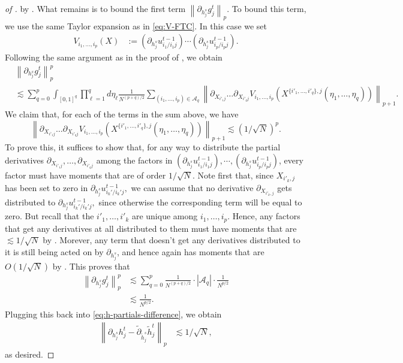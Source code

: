 \documentclass[10pt,a4paper]{amsart}
\newcommand{\calA}{\mathcal{A}}
\newcommand{\norm}[1]{\left\lVert#1\right\rVert}
\begin{document}
\begin{proof}[of ]
    by . What remains is to bound the first term $ \norm{\partial_{ h_j^s} g_j^t}_p.$ To bound this term, we use the same Taylor expansion as in \eqref{eq:V-FTC}. In this case we set 
    \begin{align}\label{eq:V-expansion-new}
    V_{i_1,\dots,i_p}(X) &:= (\partial_{ h_j^s} u_{i_1/i_1j}^{t-1}) \cdots (\partial_{ h_j^s} u_{i_p/i_pj}^{t-1}).
\end{align}
Following the same argument as in the proof of , we obtain 
\begin{align}
    &\norm{\partial_{h_j^s} g_j^t}_p^p \nonumber\\
    &\lesssim  \sum_{q=0}^p \int_{[0,1]^q} \prod_{\ell=1}^q d\eta_\ell\frac{1}{N^{(p+q)/2}}\sum_{(i_1,\dots,i_p) \in \calA_q} \norm{\partial_{X_{i'_1j}}\dots \partial_{X_{i'_qj}} V_{i_1,\dots,i_p}(X^{\{i'_1,\dots,i'_q\},j}(\eta_1,\dots,\eta_q))}_{p+1}. \nonumber
\end{align}
We claim that, for each of the terms in the sum above, we have 
\[
\norm{\partial_{X_{i'_1j}}\dots \partial_{X_{i'_qj}} V_{i_1,\dots,i_p}(X^{\{i'_1,\dots,i'_q\},j}(\eta_1,\dots,\eta_q))}_{p+1} \lesssim (1/\sqrt{N})^p.
\]
To prove this, it suffices to show that, for any way to distribute the partial derivatives $\partial_{X_{i'_1j}},\dots, \partial_{X_{i'_qj}}$ among the factors in $(\partial_{ h_j^s} u_{i_1/i_1j}^{t-1}), \cdots ,(\partial_{ h_j^s} u_{i_p/i_pj}^{t-1})$, every factor must have moments that are of order  $1/\sqrt{N}$. Note first that, since $X_{i'_k,j}$ has been set to zero in $\partial_{h_j^s}u_{i_k'/i_k'j}^{t-1},$ we can assume that no derivative $\partial_{X_{i'_k,j}}$ gets distributed to $\partial_{h_j^s}u_{i_k'/i_k'j}^{t-1},$ since otherwise the corresponding term will be equal to zero. But recall that the $i'_1,\dots,i'_k$ are unique among $i_1,\dots,i_p.$ Hence, any factors that get any derivatives at all distributed to them must have moments that are $\lesssim 1/\sqrt{N}$ by . Morever, any term that doesn't get any derivatives distributed to it is still being acted on by $\partial_{h_j^s}$, and hence again has moments that are $O(1/\sqrt{N})$ by . This proves that
\begin{align*}
    \norm{\partial_{h_j^s} g_j^t}_p^p &\lesssim \sum_{q=0}^p \frac{1}{N^{(p+q)/2}} \cdot |\calA_q|\cdot \frac{1}{N^{p/2}} \\
    &\lesssim \frac{1}{N^{p/2}}.
\end{align*}
Plugging this back into \eqref{eq:h-partials-difference}, we obtain 
\begin{align*}
    \norm{ \partial_{h_j^s}h_j^t - \tilde{\partial}_{\tilde{h}_j^s}\tilde{h}_j^t }_p &\lesssim 1/\sqrt{N},
\end{align*}
as desired.


\end{proof}
\end{document}
